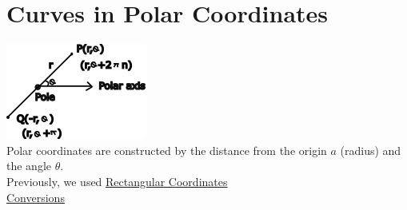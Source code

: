 \documentclass[12pt]{article}
\begin{document}
\section{Curves in Polar Coordinates}
\includegraphics{polarcoordinates}\\%
Polar coordinates are constructed by the distance from the origin $a$ (radius) and the angle $\theta$.\\%
Previously, we used \underline{Rectangular Coordinates}\\%
\underline{Conversions}
\end{document}
